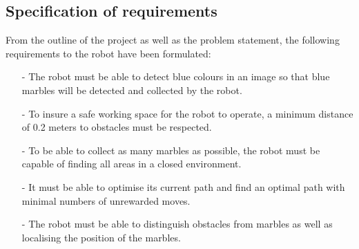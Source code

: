 \documentclass[../Head/Main.tex]{subfiles}
\begin{document}
\subsection{Specification of requirements}

From the outline of the project as well as the problem statement, the following requirements to the robot have been formulated:

\begin{itemize}

\item[-] The robot must be able to detect blue colours in an image so that blue marbles will be detected and collected by the robot.
\item[-] To insure a safe working space for the robot to operate, a minimum distance of 0.2 meters to obstacles must be respected.
\item[-] To be able to collect as many marbles as possible, the robot must be capable of finding all areas in a closed environment. 
\item[-] It must be able to optimise its current path and find an optimal path with minimal numbers of unrewarded moves.  
\item[-] The robot must be able to distinguish obstacles from marbles as well as localising the position of the marbles.      

\end{itemize}
\end{document}
